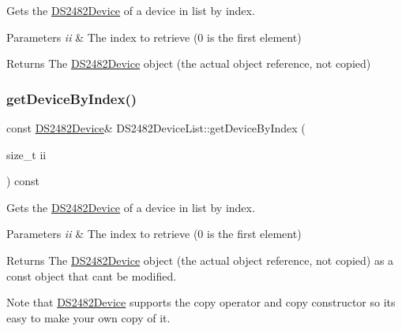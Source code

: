 Gets the \mbox{\hyperlink{class_d_s2482_device}{D\+S2482\+Device}} of a device in list by index. 


\begin{DoxyParams}{Parameters}
{\em ii} & The index to retrieve (0 is the first element)\\
\hline
\end{DoxyParams}
\begin{DoxyReturn}{Returns}
The \mbox{\hyperlink{class_d_s2482_device}{D\+S2482\+Device}} object (the actual object reference, not copied) 
\end{DoxyReturn}
\mbox{\label{class_d_s2482_device_list_a8063e2911399c2f957f05d9e41bad9fa}} 
\subsubsection{\texorpdfstring{get\+Device\+By\+Index()}{getDeviceByIndex()}\hspace{0.1cm}{\footnotesize\ttfamily [2/2]}}
{\footnotesize\ttfamily const \mbox{\hyperlink{class_d_s2482_device}{D\+S2482\+Device}}\& D\+S2482\+Device\+List\+::get\+Device\+By\+Index (\begin{DoxyParamCaption}\item[{size\+\_\+t}]{ii }\end{DoxyParamCaption}) const\hspace{0.3cm}{\ttfamily [inline]}}



Gets the \mbox{\hyperlink{class_d_s2482_device}{D\+S2482\+Device}} of a device in list by index. 


\begin{DoxyParams}{Parameters}
{\em ii} & The index to retrieve (0 is the first element)\\
\hline
\end{DoxyParams}
\begin{DoxyReturn}{Returns}
The \mbox{\hyperlink{class_d_s2482_device}{D\+S2482\+Device}} object (the actual object reference, not copied) as a const object that can\textquotesingle{}t be modified.
\end{DoxyReturn}
Note that \mbox{\hyperlink{class_d_s2482_device}{D\+S2482\+Device}} supports the copy operator and copy constructor so it\textquotesingle{}s easy to make your own copy of it. \mbox{\label{class_d_s2482_device_list_aa7fdfbd1db3a6f22aff1135e7a566666}} 
